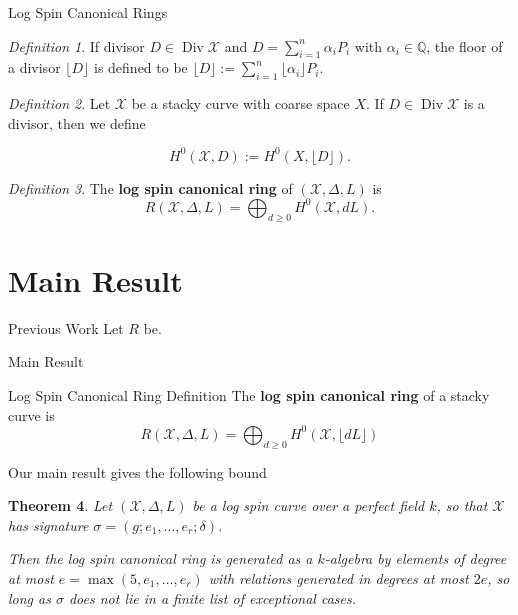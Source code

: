 \documentclass{beamer}
\newtheorem{thm}{Theorem}
\theoremstyle{remark}
\newtheorem{defn}[thm]{Definition}
\newcommand\BQ{{\mathbb Q}}
\newcommand \sx{{\mathscr X}}
\DeclareMathOperator\di{Div}
\newcommand{\halfcan}{L}
\begin{document}

\begin{frame}{Log Spin Canonical Rings}

\begin{defn}
If divisor $D \in \di \sx$ and $D = \sum_{i = 1}^{n} \alpha_i P_i$
with $\alpha_i \in \BQ$, the floor of a divisor $\lfloor D
\rfloor$ is defined to be $\lfloor D \rfloor := \sum_{i = 1}^{n}
\lfloor \alpha_i \rfloor P_i$.
\end{defn}

\pause
\begin{defn}
Let $\sx$ be a stacky curve with coarse space $X$.
If $D \in \di \sx$ is a divisor, then we define

\[
	H^0(\sx, D) := H^0(X, \lfloor D \rfloor).
\]
\end{defn}

\pause
\begin{defn}
The {\bf log spin canonical ring} of $(\sx, \Delta, \halfcan)$ is
\[
	R(\sx, \Delta, \halfcan) = \bigoplus_{d \geq 0} H^0(\sx, d \halfcan).
\]
\end{defn}

\end{frame}

\section{Main Result}

\begin{frame}{Previous Work}
Let $R$ be.

\end{frame}

\begin{frame}{Main Result}
\begin{alertblock}{Log Spin Canonical Ring Definition}
The \textbf{log spin canonical ring} of a stacky curve is
\[
	R(\sx, \Delta, \halfcan) = \bigoplus_{d \geq 0} H^0(\sx, \lfloor d \halfcan \rfloor)
\]
\end{alertblock}

Our main result gives the following bound

\pause
\begin{thm}
\label{thm:main}
Let $(\sx, \Delta, \halfcan)$ be a log spin curve over a perfect
field $k$, so that $\sx$ has signature $\sigma = (g; e_1, \ldots,
e_r; \delta)$.

Then the log spin canonical ring is generated as a $k$-algebra by 
elements of degree at most $e = \max(5, e_1, \ldots, e_r)$ with
relations generated in degrees at most $2e$,
so long as $\sigma$ does not lie in a finite list of exceptional
cases.
\end{thm}

\end{frame}
\end{document}
